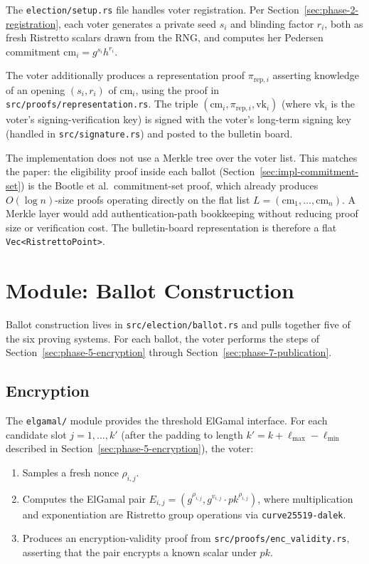 \documentclass[12pt,a4paper,oneside]{report}
\begin{document}
The \texttt{election/setup.rs} file handles voter registration. Per 
Section~\ref{sec:phase-2-registration}, each voter generates a private 
seed $s_i$ and blinding factor $r_i$, both as fresh Ristretto scalars 
drawn from the RNG, and computes her Pedersen commitment 
$\text{cm}_i = g^{s_i} h^{r_i}$.

The voter additionally produces a representation proof 
$\pi_{\text{rep}, i}$ asserting knowledge of an opening $(s_i, r_i)$ 
of $\text{cm}_i$, using the proof in \texttt{src/proofs/representation.rs}. 
The triple $(\text{cm}_i, \pi_{\text{rep}, i}, \text{vk}_i)$ (where $\text{vk}_i$ is the voter's signing-verification key) 
is signed with the voter's long-term signing key (handled in 
\texttt{src/signature.rs}) and posted to the bulletin board.

The implementation does not use a Merkle tree over the voter list. 
This matches the paper: the eligibility proof inside each ballot 
(Section~\ref{sec:impl-commitment-set}) is the Bootle et al.\ 
commitment-set proof, which already produces $O(\log n)$-size proofs 
operating directly on the flat list 
$L = (\text{cm}_1, \ldots, \text{cm}_n)$. A Merkle layer would add 
authentication-path bookkeeping without reducing proof size or 
verification cost. The bulletin-board representation is therefore a 
flat \texttt{Vec<RistrettoPoint>}.

\section{Module: Ballot Construction}
\label{sec:impl-ballot}

Ballot construction lives in \texttt{src/election/ballot.rs} and pulls 
together five of the six proving systems. For each ballot, the voter 
performs the steps of Section~\ref{sec:phase-5-encryption} through 
Section~\ref{sec:phase-7-publication}.

\subsection{Encryption}
\label{sec:impl-encryption}

The \texttt{elgamal/} module provides the threshold ElGamal interface. 
For each candidate slot $j = 1, \ldots, k'$ (after the padding to length 
$k' = k + \ell_{\max} - \ell_{\min}$ described in 
Section~\ref{sec:phase-5-encryption}), the voter:

\begin{enumerate}
    \item Samples a fresh nonce $\rho_{i, j}$.
    \item Computes the ElGamal pair 
    $E_{i, j} = (g^{\rho_{i, j}}, g^{v_{i, j}} \cdot pk^{\rho_{i, j}})$, 
    where multiplication and exponentiation are Ristretto group operations 
    via \texttt{curve25519-dalek}.
    \item Produces an encryption-validity proof from 
    \texttt{src/proofs/enc\_validity.rs}, asserting that the pair encrypts 
    a known scalar under $pk$.
\end{enumerate}
\end{document}
